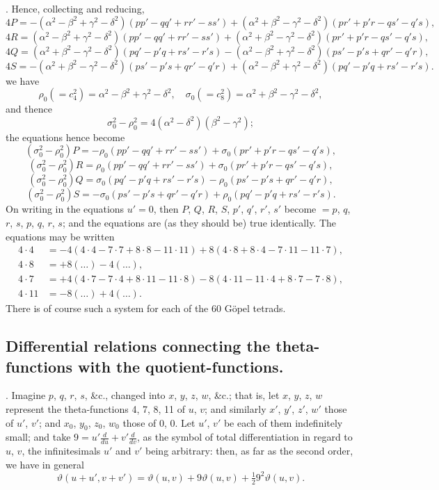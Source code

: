\documentclass[11pt,a4paper]{book}
\begin{document}
\newpage
\setcounter{page}{557}

. Hence, collecting and reducing,
\[
4P = -(\alpha^2 - \beta^2 + \gamma^2 - \delta^2)(pp' - qq' + rr' - ss') + (\alpha^2 + \beta^2 - \gamma^2 - \delta^2)(pr' + p'r - qs' - q's),
\]
\[
4R = (\alpha^2 - \beta^2 + \gamma^2 - \delta^2)(pp' - qq' + rr' - ss') + (\alpha^2 + \beta^2 - \gamma^2 - \delta^2)(pr' + p'r - qs' - q's),
\]
\[
4Q = (\alpha^2 + \beta^2 - \gamma^2 - \delta^2)(pq' - p'q + rs' - r's) - (\alpha^2 - \beta^2 + \gamma^2 - \delta^2)(ps' - p's + qr' - q'r),
\]
\[
4S = -(\alpha^2 + \beta^2 - \gamma^2 - \delta^2)(ps' - p's + qr' - q'r) + (\alpha^2 - \beta^2 + \gamma^2 - \delta^2)(pq' - p'q + rs' - r's).
\]
we have
\[
\rho_0 (= c_4^2) = \alpha^2 - \beta^2 + \gamma^2 - \delta^2,\quad \sigma_0 (= c_8^2) = \alpha^2 + \beta^2 - \gamma^2 - \delta^2,
\]
and thence
\[
\sigma_0^2 - \rho_0^2 = 4(\alpha^2 - \delta^2)(\beta^2 - \gamma^2);
\]
the equations hence become
\[
(\sigma_0^2 - \rho_0^2) P = -\rho_0(pp' - qq' + rr' - ss') + \sigma_0(pr' + p'r - qs' - q's),
\]
\[
(\sigma_0^2 - \rho_0^2) R = \rho_0(pp' - qq' + rr' - ss') + \sigma_0(pr' + p'r - qs' - q's),
\]
\[
(\sigma_0^2 - \rho_0^2) Q = \sigma_0(pq' - p'q + rs' - r's) - \rho_0(ps' - p's + qr' - q'r),
\]
\[
(\sigma_0^2 - \rho_0^2) S = -\sigma_0(ps' - p's + qr' - q'r) + \rho_0(pq' - p'q + rs' - r's).
\]
On writing in the equations $u' = 0$, then $P$, $Q$, $R$, $S$, $p'$, $q'$, $r'$, $s'$ become $= p$, $q$, $r$, $s$, $p$, $q$, $r$, $s$; and the equations are (as they should be) true identically. The equations may be written
\[
\begin{aligned}
4 \cdot 4 &= -4(4 \cdot 4 - 7 \cdot 7 + 8 \cdot 8 - 11 \cdot 11) + 8(4 \cdot 8 + 8 \cdot 4 - 7 \cdot 11 - 11 \cdot 7),\\
4 \cdot 8 &= +8(\dots) - 4(\dots),\\
4 \cdot 7 &= +4(4 \cdot 7 - 7 \cdot 4 + 8 \cdot 11 - 11 \cdot 8) - 8(4 \cdot 11 - 11 \cdot 4 + 8 \cdot 7 - 7 \cdot 8),\\
4 \cdot 11 &= -8(\dots) + 4(\dots).
\end{aligned}
\]
There is of course such a system for each of the 60 G\"opel tetrads.

\subsection*{Differential relations connecting the theta-functions with the quotient-functions.}

. Imagine $p$, $q$, $r$, $s$, \&c., changed into $x$, $y$, $z$, $w$, \&c.; that is, let $x$, $y$, $z$, $w$ represent the theta-functions 4, 7, 8, 11 of $u$, $v$; and similarly $x'$, $y'$, $z'$, $w'$ those of $u'$, $v'$; and $x_0$, $y_0$, $z_0$, $w_0$ those of $0$, $0$. Let $u'$, $v'$ be each of them indefinitely small; and take $9 = u' \frac{d}{du} + v' \frac{d}{dv}$, as the symbol of total differentiation in regard to $u$, $v$, the infinitesimals $u'$ and $v'$ being arbitrary: then, as far as the second order, we have in general
\[
\vartheta(u+u', v+v') = \vartheta(u,v) + 9\vartheta(u,v) + \tfrac12 9^2 \vartheta(u,v).
\]
\end{document}
